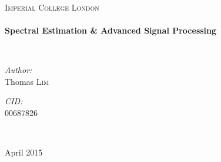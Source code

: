 \documentclass[main.tex]{subfiles}
\begin{document}
\begin{titlepage}
\begin{center}

~\\[2cm]
\textsc{\LARGE Imperial College London}\\[0.5cm]

\HRule \\[0.4cm]
{ \huge \bfseries Spectral Estimation \& Advanced Signal Processing \\[0.4cm] }

\HRule \\[1cm]

\begin{minipage}{0.5\textwidth}
\begin{flushleft} \large
\emph{Author:}\\
Thomas \textsc{Lim}
\end{flushleft}
\end{minipage}
\begin{minipage}{0.4\textwidth}
\begin{flushright} \large
\emph{CID:} \\
00687826
\end{flushright}
\end{minipage}
\\[0.5cm]


\vfill

{\large April 2015}

\end{center}
\end{titlepage}
\end{document}
